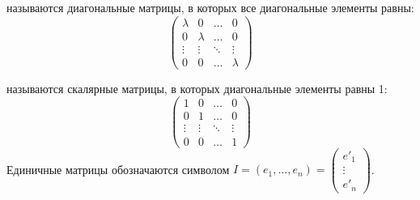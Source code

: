 \begin{opred}
 называются диагональные матрицы, в которых все диагональные элементы равны:\newline
$$
\begin{pmatrix}
\lambda & 0       & \ldots & 0      \\
0       & \lambda & \ldots & 0      \\
\vdots  & \vdots  & \ddots & \vdots \\
0       & 0       & \ldots & \lambda
\end{pmatrix}
$$
\end{opred}
\begin{opred}
 называются скалярные матрицы, в которых диагональные элементы равны 1:\newline
$$
\begin{pmatrix}
1&     0&       \ldots& 0      \\
0&     1&       \ldots& 0      \\
\vdots& \vdots& \ddots& \vdots \\
0&      0&      \ldots& 1
\end{pmatrix}
$$
Единичные матрицы обозначаются символом $I=(e_1,\ldots,e_n)=\begin{pmatrix}
e'_1 \\
\vdots \\
e'_n\end{pmatrix}$.
\end{opred}
